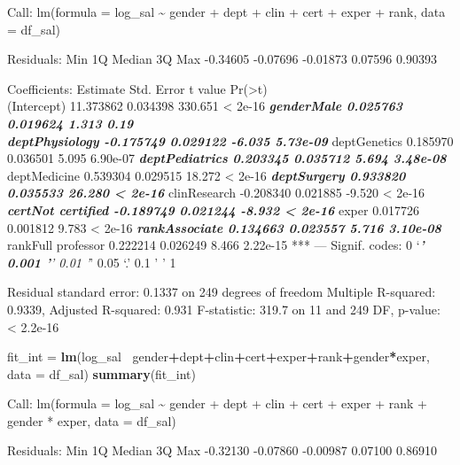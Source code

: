 \documentclass[]{article}
\newenvironment{Shaded}{\begin{snugshade}}{\end{snugshade}}
\newcommand{\DataTypeTok}[1]{\textcolor[rgb]{0.13,0.29,0.53}{#1}}
\newcommand{\KeywordTok}[1]{\textcolor[rgb]{0.13,0.29,0.53}{\textbf{#1}}}
\newcommand{\NormalTok}[1]{#1}
\newcommand{\OperatorTok}[1]{\textcolor[rgb]{0.81,0.36,0.00}{\textbf{#1}}}
\newcommand{\StringTok}[1]{\textcolor[rgb]{0.31,0.60,0.02}{#1}}
\begin{document}
Call: lm(formula = log\_sal \textasciitilde{} gender + dept + clin +
cert + exper + rank, data = df\_sal)

Residuals: Min 1Q Median 3Q Max -0.34605 -0.07696 -0.01873 0.07596
0.90393

Coefficients: Estimate Std. Error t value
Pr(\textgreater{}\textbar{}t\textbar{})\\
(Intercept) 11.373862 0.034398 330.651 \textless{} 2e-16 \textbf{\emph{
genderMale 0.025763 0.019624 1.313 0.19\\
deptPhysiology -0.175749 0.029122 -6.035 5.73e-09 }} deptGenetics
0.185970 0.036501 5.095 6.90e-07 \textbf{\emph{ deptPediatrics 0.203345
0.035712 5.694 3.48e-08 }} deptMedicine 0.539304 0.029515 18.272
\textless{} 2e-16 \textbf{\emph{ deptSurgery 0.933820 0.035533 26.280
\textless{} 2e-16 }} clinResearch -0.208340 0.021885 -9.520 \textless{}
2e-16 \textbf{\emph{ certNot certified -0.189749 0.021244 -8.932
\textless{} 2e-16 }} exper 0.017726 0.001812 9.783 \textless{} 2e-16
\textbf{\emph{ rankAssociate 0.134663 0.023557 5.716 3.10e-08 }}
rankFull professor 0.222214 0.026249 8.466 2.22e-15 *** --- Signif.
codes: 0 `\emph{\textbf{' 0.001 '}' 0.01 '}' 0.05 `.' 0.1 ' ' 1

Residual standard error: 0.1337 on 249 degrees of freedom Multiple
R-squared: 0.9339, Adjusted R-squared: 0.931 F-statistic: 319.7 on 11
and 249 DF, p-value: \textless{} 2.2e-16

\begin{Shaded}
\begin{Highlighting}[]
\NormalTok{fit_int =}\StringTok{ }\KeywordTok{lm}\NormalTok{(log_sal }\OperatorTok{~}\NormalTok{gender}\OperatorTok{+}\NormalTok{dept}\OperatorTok{+}\NormalTok{clin}\OperatorTok{+}\NormalTok{cert}\OperatorTok{+}\NormalTok{exper}\OperatorTok{+}\NormalTok{rank}\OperatorTok{+}\NormalTok{gender}\OperatorTok{*}\NormalTok{exper, }\DataTypeTok{data =}\NormalTok{ df_sal)}
\KeywordTok{summary}\NormalTok{(fit_int)}
\end{Highlighting}
\end{Shaded}

Call: lm(formula = log\_sal \textasciitilde{} gender + dept + clin +
cert + exper + rank + gender * exper, data = df\_sal)

Residuals: Min 1Q Median 3Q Max -0.32130 -0.07860 -0.00987 0.07100
0.86910
\end{document}
